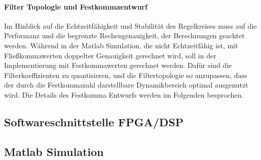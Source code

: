 \paragraph{Filter Topologie und Festkommaentwurf}
Im Hinblick auf die Echtzeitfähigkeit und Stabilität des Regelkreises muss auf die Performanz und die begrenzte Rechengenauigkeit, der Berechnungen geachtet werden. Während in der Matlab Simulation, die nicht Echtzeitfähig ist, mit Fließkommawerten doppelter Genauigkeit gerechnet wird, soll in der Implementierung mit Festkommawerten gerechnet werden.
Dafür sind die Filterkoeffizienten zu quantisieren, und die Filtertopologie so anzupassen, dass der durch die Festkommazahl darstellbare Dynamikbereich optimal ausgenutzt wird. Die Details des Festkomma Entwurfs werden im Folgenden besprochen.



\subsection{Softwareschnittstelle FPGA/DSP}





\subsection{Matlab Simulation}

